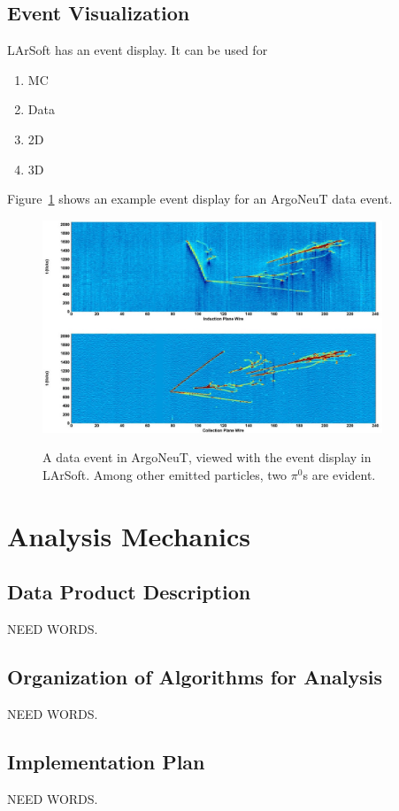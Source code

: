\documentclass[12pt]{elsarticle}
\begin{document}
\subsection{Event Visualization}
LArSoft has an event display.
It can be used for
\begin{enumerate}
\item{MC}
\item{Data}
\item{2D}
\item{3D}
\end{enumerate}  

Figure~\ref{argo.evd} shows an example event display for an ArgoNeuT data event.

\hspace*{2cm}
\begin{figure}[h]
\centering
\caption{A data event in ArgoNeuT, viewed with the event display in LArSoft. Among other emitted particles, two $\pi^0$s are evident.}
\includegraphics[width=4.0in]{./imgs/ArgoNeuT_event.jpg}
\label{argo.evd}
\end{figure}



               
\section{Analysis Mechanics}

\subsection{Data Product Description}
NEED WORDS.

\subsection{Organization of Algorithms for Analysis}
NEED WORDS.

\subsection{Implementation Plan}
NEED WORDS.
\end{document}
